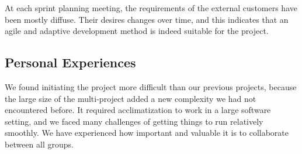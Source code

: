 At each sprint planning meeting, the requirements of the external customers have been mostly diffuse. Their desires changes over time, and this indicates that an agile and adaptive development method is indeed suitable for the project.

\subsection{Personal Experiences}
We found initiating the project more difficult than our previous projects, because the large size of the multi-project added a new complexity we had not encountered before. It required acclimatization to work in a large software setting, and we faced many challenges of getting things to run relatively smoothly. We have experienced how important and valuable it is to collaborate between all groups.
 
